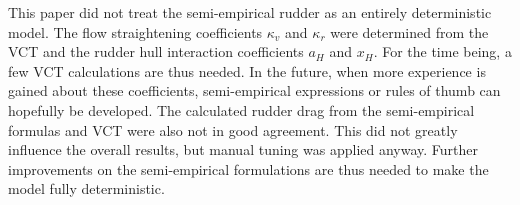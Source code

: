 This paper did not treat the semi-empirical rudder as an entirely deterministic model. The flow straightening coefficients $\kappa_v$ and $\kappa_r$ were determined from the VCT and the rudder hull interaction coefficients $a_H$ and $x_H$. For the time being, a few VCT calculations are thus needed.
In the future, when more experience is gained about these coefficients, semi-empirical expressions or rules of thumb can hopefully be developed.
The calculated rudder drag from the semi-empirical formulas and VCT were also not in good agreement.
This did not greatly influence the overall results, but manual tuning was applied anyway.
Further improvements on the semi-empirical formulations are thus needed to make the model fully deterministic.
